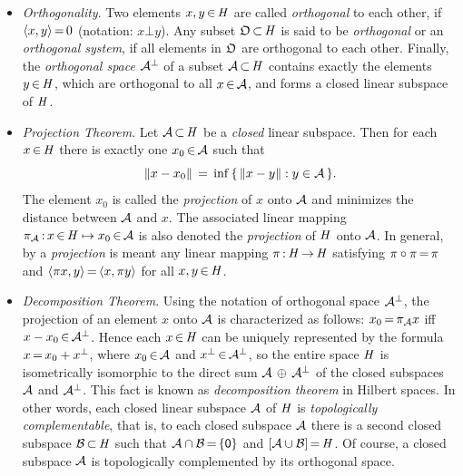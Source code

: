 \documentclass[11pt,twoside]{article}
\begin{document}
\begin{itemize}[leftmargin=12pt,itemsep=5pt]
\item[1.] \textit{Orthogonality}.
Two elements $x,y {\,\in\,} \mathit{H}$ are called \textit{orthogonal} to each other,
if $\langle x,y \rangle {\,=\,} 0$ (notation: $x \bot y$).
Any subset $\mathfrak{O} {\,\subset\,} \mathit{H}$ is said to be \textit{orthogonal}
or an \textit{orthogonal system},
if all elements in $\mathfrak{O}$ are orthogonal to each other.
Finally,
the \textit{orthogonal space} $\mathcal{A}^{\bot}$ of a subset $\mathcal{A} {\,\subset\,} \mathit{H}$
contains exactly the elements $y {\,\in\,} \mathit{H}$,
which are orthogonal to all $x {\,\in\,} \mathcal{A}$,
and forms a closed linear subspace of $\mathit{H}$.

\item[2.] \textit{Projection Theorem}.
Let $\mathcal{A} {\,\subset\,} \mathit{H}$ be a \textit{closed} linear subspace.
Then for each $x {\,\in\,} \mathit{H}$ there is exactly one $x_0 {\,\in\,} \mathcal{A}$
such that
\[
\left\lVert  x - x_0  \right\rVert \,=\, \inf \, \{ \, \left\lVert x-y \right\rVert: y \in \mathcal{A} \,\}.
\]
The element $x_0$ is called the \textit{projection} of $x$ onto $\mathcal{A}$
and minimizes the distance between $\mathcal{A}$ and $x$.
The associated linear mapping
$\pi_{\mathcal{A}} {\,:\,} x {\,\in\,} \mathit{H} \mapsto x_0 {\,\in\,} \mathcal{A}$
is also denoted the \textit{projection} of $\mathit{H}$ onto $\mathcal{A}$.
In general,
by a \textit{projection} is meant
any linear mapping $\pi{\,:\,}\mathit{H} {\,\to\,} \mathit{H}$ satisfying
$\pi \circ \pi {\,=\,} \pi$ and
$\langle \pi x,y \rangle {\,=\,} \langle x,\pi y \rangle$ for all $x,y {\,\in\,} \mathit{H}$.

\item[3.] \textit{Decomposition Theorem}.
Using the notation of orthogonal space $\mathcal{A}^{\bot}$,
the projection of an element $x$ onto $\mathcal{A}$ is characterized as follows:
$x_0 {\,=\,} \pi_{\mathcal{A}} x$ iff $x-x_0 {\,\in\,} \mathcal{A}^{\bot}$.
Hence each $x {\,\in\,} \mathit{H}$ can be uniquely represented by the formula
$x {\,=\,} x_0 + x^{\bot}$,
where $x_0 {\,\in\,} \mathcal{A}$ and $x^{\bot} {\,\in\,} \mathcal{A}^{\bot}$,
so the entire space $\mathit{H}$ is isometrically isomorphic
to the direct sum $\mathcal{A} \, \oplus \, \mathcal{A}^{\bot}$
of the closed subspaces $\mathcal{A}$ and $\mathcal{A}^{\bot}$.
This fact is known as \textit{decomposition theorem} in Hilbert spaces.
In other words,
each closed linear subspace $\mathcal{A}$ of $\mathit{H}$
is \textit{topologically complementable},
that is,
to each closed subspace $\mathcal{A}$
there is a second closed subspace $\mathcal{B} {\,\subset\,} \mathit{H}$
such that $\mathcal{A} \cap \mathcal{B} {\,=\,} \{{\mathsf{0}}\}$ and $[\mathcal{A} \cup \mathcal{B}] {\,=\,} \mathit{H}$.
Of course,
a closed subspace ${\mathcal{A}}$ is topologically complemented
by its orthogonal space. %


\end{itemize}
\end{document}

